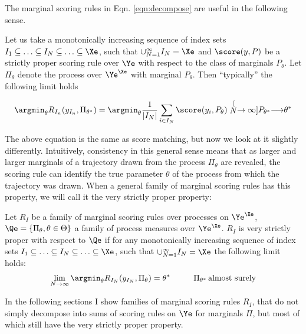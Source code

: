 The marginal scoring rules in Eqn. \eqref{eqn:decompose} are useful in the following sense.

\begin{statement}
Let us take a monotonically increasing sequence of index sets $I_1\subseteq\ldots\subseteq I_N \subseteq \ldots \subseteq \Xe$, such that $\cup_{N=1}^{\infty} I_N = \Xe$ and $\score(y,P)$ be a strictly proper scoring rule over $\Ye$ with respect to the class of marginals $P_{\theta}$. Let $\Pi_{\theta}$ denote the \iid process over $\Ye^{\Xe}$ with marginal $P_{\theta}$. Then ``typically'' the following limit holds

\begin{align}
\argmin_{\theta}R_{I_n}(y_{I_n},\Pi_{\theta^{*}}) =  \argmin_{\theta} \frac{1}{\vert I_N \vert} \sum_{i\in I_N} \score(y_i,P_{\theta}) \stackrel[N\rightarrow\infty]{P_{\theta^{*}}}{\longrightarrow} \theta^{*}
\end{align}
\end{statement}

The above equation is the same as score matching, but now we look at it slightly differently. Intuitively, consistency in this general sense means that as larger and larger marginals of a trajectory drawn from the process $\Pi_{\theta}$ are revealed, the scoring rule can identify the true parameter $\theta$ of the process from which the trajectory was drawn. When a general family of marginal scoring rules has this property, we will call it the very strictly proper property:

\begin{definition}\label{thm:very_strictly_proper}
Let $R_{I}$ be a family of marginal scoring rules over processes on $\Ye^{\Xe}$, $\Qe = \{\Pi_\theta, \theta\in\Theta\}$ a family of process measures over $\Ye^{\Xe}$. $R_{I}$ is very strictly proper with respect to $\Qe$ if for any monotonically increasing sequence of index sets $I_1\subseteq\ldots\subseteq I_N \subseteq \ldots \subseteq \Xe$, such that $\cup_{N=1}^{\infty} I_N = \Xe$ the following limit holds:
\begin{align}
\lim_{N\rightarrow\infty} \argmin_{\theta} R_{I_N}(y_{I_N},\Pi_{\theta}) = \theta^{*}\hspace{1cm}\Pi_{\theta^{*}}\mbox{\,almost surely}
\end{align}
\end{definition}

In the following sections I show families of marginal scoring rules $R_I$, that do not simply decompose into sums of scoring rules on $\Ye$ for marginals $\Pi$, but most of which still have the very strictly proper property.

